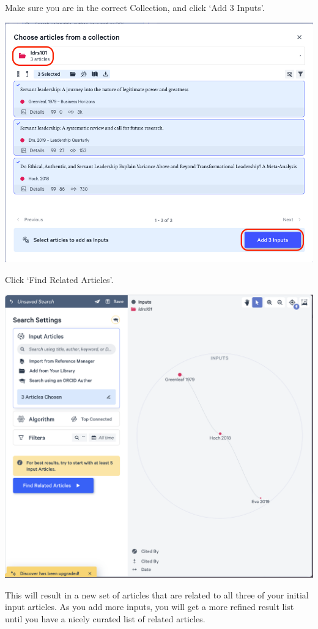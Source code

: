 \documentclass[
]{book}
\theoremstyle{definition}
\theoremstyle{definition}
\theoremstyle{definition}
\theoremstyle{definition}
\theoremstyle{remark}
\begin{document}
Make sure you are in the correct Collection, and click `Add 3 Inputs'.

\includegraphics{assets/u2/litmaps7.png}

Click `Find Related Articles'.

\includegraphics{assets/u2/litmaps8.png}

This will result in a new set of articles that are related to all three of your initial input articles. As you add more inputs, you will get a more refined result list until you have a nicely curated list of related articles.
\end{document}
